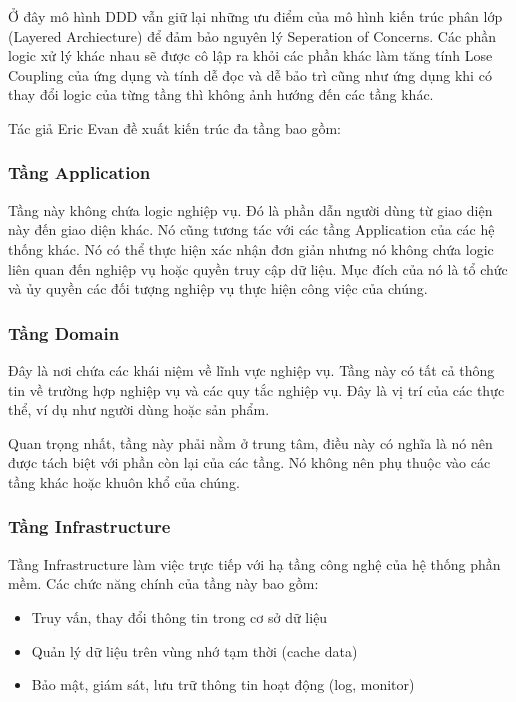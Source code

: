 Ở đây mô hình DDD vẫn giữ lại những ưu điểm của mô hình kiến trúc phân lớp (Layered Archiecture) để đảm bảo nguyên lý Seperation of Concerns. Các phần logic xử lý khác nhau sẽ được cô lập ra khỏi các phần khác làm tăng tính Lose Coupling của ứng dụng và tính dễ đọc và dễ bảo trì cũng như ứng dụng khi có thay đổi logic của từng tầng thì không ảnh hướng đến các tầng khác.

Tác giả Eric Evan đề xuất kiến trúc đa tầng bao gồm:

\subsubsection{Tầng Application}

Tầng này không chứa logic nghiệp vụ. Đó là phần dẫn người dùng từ giao diện này đến giao diện khác. Nó cũng tương tác với các tầng Application của các hệ thống khác. Nó có thể thực hiện xác nhận đơn giản nhưng nó không chứa logic liên quan đến nghiệp vụ hoặc quyền truy cập dữ liệu. Mục đích của nó là tổ chức và ủy quyền các đối tượng nghiệp vụ thực hiện công việc của chúng.

\subsubsection{Tầng Domain}

Đây là nơi chứa các khái niệm về lĩnh vực nghiệp vụ. Tầng này có tất cả thông tin về trường hợp nghiệp vụ và các quy tắc nghiệp vụ. Đây là vị trí của các thực thể, ví dụ như người dùng hoặc sản phẩm.

Quan trọng nhất, tầng này phải nằm ở trung tâm, điều này có nghĩa là nó nên được tách biệt với phần còn lại của các tầng. Nó không nên phụ thuộc vào các tầng khác hoặc khuôn khổ của chúng.

\subsubsection{Tầng Infrastructure}

Tầng Infrastructure làm việc trực tiếp với hạ tầng công nghệ của hệ thống phần mềm. Các chức năng chính của tầng này bao gồm:

\begin{itemize}
	\item Truy vấn, thay đổi thông tin trong cơ sở dữ liệu
	\item Quản lý dữ liệu trên vùng nhớ tạm thời (cache data)
	\item Bảo mật, giám sát, lưu trữ thông tin hoạt động (log, monitor)
\end{itemize}

